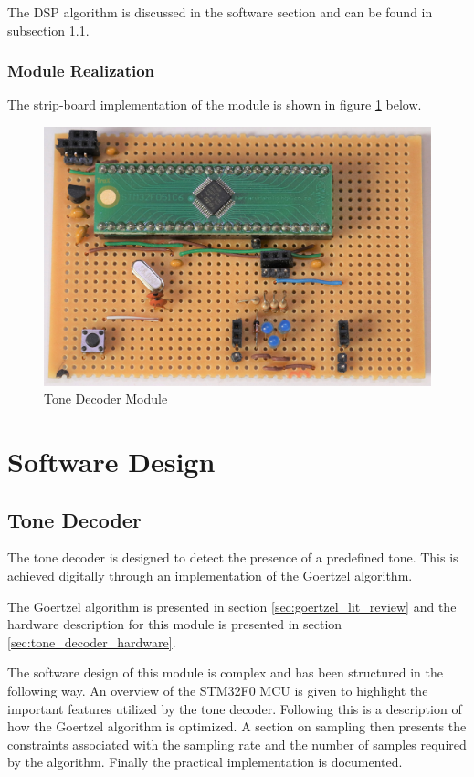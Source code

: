 The DSP algorithm is discussed in the software section and can be found in subsection \ref{tone_decoder_software}.

\subsubsection{Module Realization}
The strip-board implementation of the module is shown in figure \ref{fig:module_tone_decoder} below.

\begin{figure}[H]
	\centering
	\includegraphics[width=.6\textwidth]{figures/modules/goertzel_filter.jpg}
	\caption{Tone Decoder Module}
	\label{fig:module_tone_decoder}
\end{figure}


\section{Software Design}

\subsection{Tone Decoder}
\label{tone_decoder_software}

The tone decoder is designed to detect the presence of a predefined tone. This is achieved digitally through an implementation of the Goertzel algorithm.

The Goertzel algorithm is presented in section \ref{sec:goertzel_lit_review} and the hardware description for this module is presented in section \ref{sec:tone_decoder_hardware}.

The software design of this module is complex and has been structured in the following way. An overview of the STM32F0 MCU is given to highlight the important features utilized by the tone decoder. Following this is a description of how the Goertzel algorithm is optimized. A section on sampling then presents the constraints associated with the sampling rate and the number of samples required by the algorithm. Finally the practical implementation is documented.


